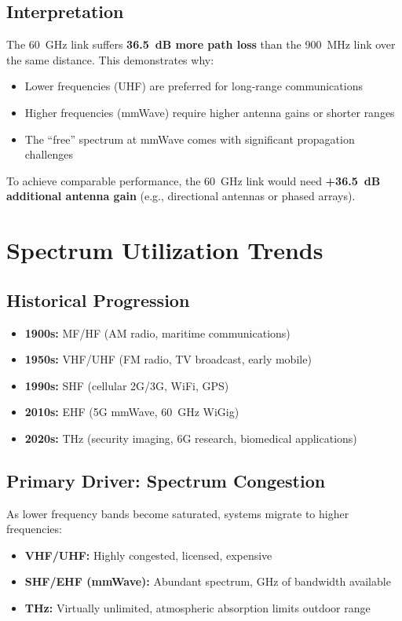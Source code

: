 \subsection*{Interpretation}

The 60~GHz link suffers \textbf{36.5~dB more path loss} than the 900~MHz link over the same distance. This demonstrates why:
\begin{itemize}
\item Lower frequencies (UHF) are preferred for long-range communications
\item Higher frequencies (mmWave) require higher antenna gains or shorter ranges
\item The ``free'' spectrum at mmWave comes with significant propagation challenges
\end{itemize}

To achieve comparable performance, the 60~GHz link would need \textbf{+36.5~dB additional antenna gain} (e.g., directional antennas or phased arrays).

\section{Spectrum Utilization Trends}

\subsection{Historical Progression}

\begin{itemize}
\item \textbf{1900s:} MF/HF (AM radio, maritime communications)
\item \textbf{1950s:} VHF/UHF (FM radio, TV broadcast, early mobile)
\item \textbf{1990s:} SHF (cellular 2G/3G, WiFi, GPS)
\item \textbf{2010s:} EHF (5G mmWave, 60~GHz WiGig)
\item \textbf{2020s:} THz (security imaging, 6G research, biomedical applications)
\end{itemize}

\subsection{Primary Driver: Spectrum Congestion}

As lower frequency bands become saturated, systems migrate to higher frequencies:

\begin{itemize}
\item \textbf{VHF/UHF:} Highly congested, licensed, expensive
\item \textbf{SHF/EHF (mmWave):} Abundant spectrum, GHz of bandwidth available
\item \textbf{THz:} Virtually unlimited, atmospheric absorption limits outdoor range
\end{itemize}

